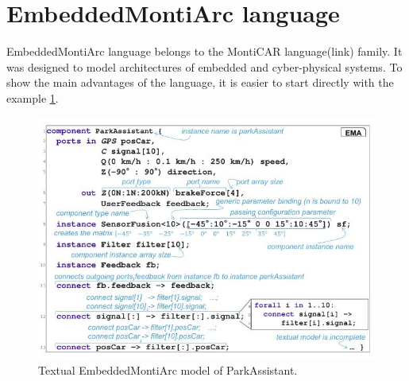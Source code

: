 \section{EmbeddedMontiArc language} \label{sec:ema}
EmbeddedMontiArc language belongs to the MontiCAR language(link) family. It was designed to model architectures of embedded and cyber-physical systems. To show the main advantages of the language, it is easier to start directly with the example \ref{fig:embdmontiarc}.
\begin{figure}[h!]
    \centering
    \includegraphics[width=0.8\linewidth]{src/pic/embdmontiarc}
    \caption{Textual EmbeddedMontiArc model of ParkAssistant.}
    \label{fig:embdmontiarc}
\end{figure} \\
